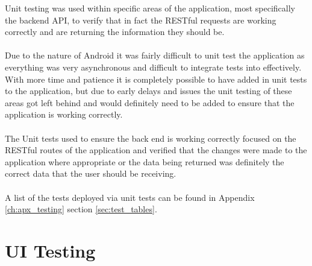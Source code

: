Unit testing was used within specific areas of the application, most specifically the backend API, to verify that in fact the RESTful requests are working correctly and are returning the information they should be.\\
\\
Due to the nature of Android it was fairly difficult to unit test the application as everything was very asynchronous and difficult to integrate tests into effectively. With more time and patience it is completely possible to have added in unit tests to the application, but due to early delays and issues the unit testing of these areas got left behind and would definitely need to be added to ensure that the application is working correctly.\\
\\
The Unit tests used to ensure the back end is working correctly focused on the RESTful routes of the application and verified that the changes were made to the application where appropriate or the data being returned was definitely the correct data that the user should be receiving.\\
\\
A list of the tests deployed via unit tests can be found in Appendix \ref{ch:apx_testing} section \ref{sec:test_tables}.

\section{UI Testing}


